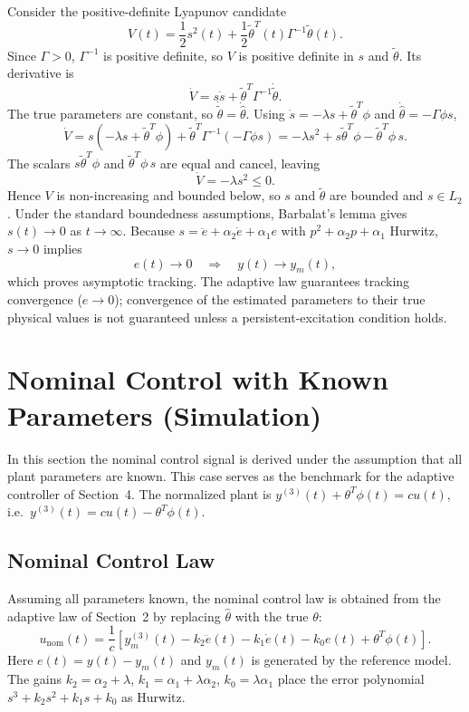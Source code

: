 \documentclass[12pt]{article}
\begin{document}
\noindent Consider the positive-definite Lyapunov candidate
\[
\boxed{
V(t)=
\frac{1}{2}s^2(t)
+
\frac{1}{2}\tilde{\theta}^T(t)\Gamma^{-1}\tilde{\theta}(t).
}
\]
\noindent Since \(\Gamma>0\), \(\Gamma^{-1}\) is positive definite, so \(V\) is positive definite in \(s\) and \(\tilde{\theta}\). Its derivative is
\[
\dot{V}
=
s\dot{s}
+
\tilde{\theta}^T\Gamma^{-1}\dot{\tilde{\theta}}.
\]
\noindent The true parameters are constant, so \(\dot{\tilde{\theta}}=\dot{\hat{\theta}}\). Using \(\dot{s}=-\lambda s+\tilde{\theta}^T\phi\) and \(\dot{\hat{\theta}}=-\Gamma\phi s\),
\[
\dot{V}
=
s\!\left(-\lambda s+\tilde{\theta}^T\phi\right)
+
\tilde{\theta}^T\Gamma^{-1}\!\left(-\Gamma\phi s\right)
=
-\lambda s^2
+
s\tilde{\theta}^T\phi
-
\tilde{\theta}^T\phi\, s.
\]
\noindent The scalars \(s\tilde{\theta}^T\phi\) and \(\tilde{\theta}^T\phi\,s\) are equal and cancel, leaving
\[
\boxed{
\dot{V}=-\lambda s^2\leq 0.
}
\]
\noindent Hence \(V\) is non-increasing and bounded below, so \(s\) and \(\tilde{\theta}\) are bounded and \(s\in L_2\). Under the standard boundedness assumptions, Barbalat's lemma gives \(s(t)\rightarrow 0\) as \(t\rightarrow\infty\). Because \(s=\ddot{e}+\alpha_2\dot{e}+\alpha_1e\) with \(p^2+\alpha_2p+\alpha_1\) Hurwitz, \(s\rightarrow0\) implies
\[
\boxed{
e(t)\rightarrow 0
\quad\Longrightarrow\quad
y(t)\rightarrow y_m(t),
}
\]
\noindent which proves asymptotic tracking. The adaptive law guarantees tracking convergence (\(e\to0\)); convergence of the estimated parameters to their true physical values is not guaranteed unless a persistent-excitation condition holds.


\section{Nominal Control with Known Parameters (Simulation)}

\noindent In this section the nominal control signal is derived under the assumption that all plant parameters are known. This case serves as the benchmark for the adaptive controller of Section~4. The normalized plant is \(y^{(3)}(t)+\theta^T\phi(t)=cu(t)\), i.e.\ \(y^{(3)}(t)=cu(t)-\theta^T\phi(t)\).

\subsection{Nominal Control Law}

\noindent Assuming all parameters known, the nominal control law is obtained from the adaptive law of Section~2 by replacing \(\hat{\theta}\) with the true \(\theta\):
\[
\boxed{
u_{\text{nom}}(t)=
\frac{1}{c}
\left[
y_m^{(3)}(t)
-
k_2\ddot{e}(t)
-
k_1\dot{e}(t)
-
k_0e(t)
+
\theta^T\phi(t)
\right].
}
\]
\noindent Here \(e(t)=y(t)-y_m(t)\) and \(y_m(t)\) is generated by the reference model. The gains \(k_2=\alpha_2+\lambda\), \(k_1=\alpha_1+\lambda\alpha_2\), \(k_0=\lambda\alpha_1\) place the error polynomial \(s^3+k_2s^2+k_1s+k_0\) as Hurwitz.
\end{document}
